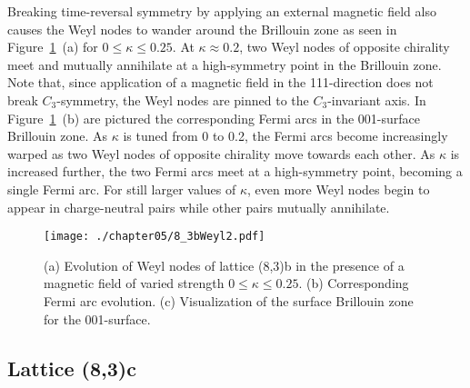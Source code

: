 Breaking time-reversal symmetry by applying an external magnetic field also causes the Weyl nodes to wander around the Brillouin zone as seen in Figure~\ref{fig:chapter05_8_3bWeyl2}~(a) for $0 \leq \kappa \leq 0.25$.
At $\kappa \approx 0.2$, two Weyl nodes of opposite chirality meet and mutually annihilate at a high-symmetry point in the Brillouin zone.
Note that, since application of a magnetic field in the 111-direction does not break $C_3$-symmetry, the Weyl nodes are pinned to the $C_3$-invariant axis.
In Figure~\ref{fig:chapter05_8_3bWeyl2}~(b) are pictured the corresponding Fermi arcs in the 001-surface Brillouin zone.
As $\kappa$ is tuned from 0 to 0.2, the Fermi arcs become increasingly warped as two Weyl nodes of opposite chirality move towards each other.
As $\kappa$ is increased further, the two Fermi arcs meet at a high-symmetry point, becoming a single Fermi arc.
For still larger values of $\kappa$, even more Weyl nodes begin to appear in charge-neutral pairs while other pairs mutually annihilate.
%
\begin{figure}[tb]
	\centering
	\texttt{[image: ./chapter05/8\_3bWeyl2.pdf]}
	\caption{
		(a) Evolution of Weyl nodes of lattice (8,3)b in the presence of a magnetic field of varied strength $0 \leq \kappa \leq 0.25$.
		(b) Corresponding Fermi arc evolution.
		(c) Visualization of the surface Brillouin zone for the 001-surface.
	}
	\label{fig:chapter05_8_3bWeyl2}
\end{figure}
%


%
%
\subsection{Lattice (8,3)c}
\label{section:chapter05_8_3c}
%
%
